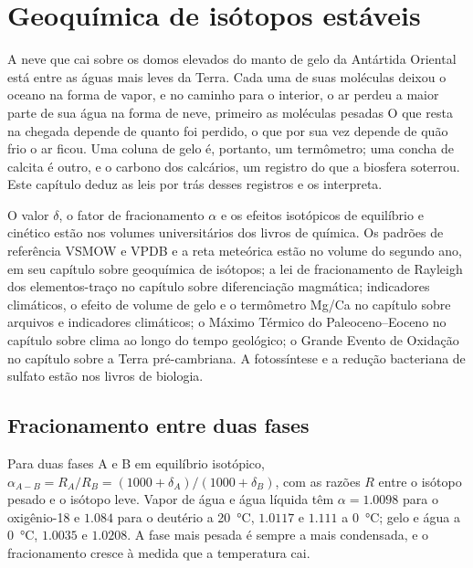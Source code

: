 \chapter{Geoquímica de isótopos estáveis}\label{ch:b3:stable-isotopes}

A neve que cai sobre os domos elevados do manto de gelo da Antártida Oriental está entre
as águas mais leves da Terra. Cada uma de suas moléculas deixou o oceano na forma de vapor, e
no caminho para o interior, o ar perdeu a maior parte de sua água na forma de neve, primeiro as moléculas pesadas
O que resta na chegada depende de quanto foi perdido, o que por sua vez depende de
quão frio o ar ficou. Uma coluna de gelo é, portanto, um termômetro; uma concha
de calcita é outro, e o carbono dos calcários, um registro do que a
biosfera soterrou. Este capítulo deduz as leis por trás desses registros e
os interpreta.

\begin{recall}
O valor $\delta$, o fator de fracionamento $\alpha$ e os efeitos isotópicos de equilíbrio e
cinético estão nos volumes universitários dos livros de química. Os
padrões de referência VSMOW e VPDB e a reta meteórica estão no
volume do segundo ano, em seu capítulo sobre geoquímica de isótopos; a lei de
fracionamento de Rayleigh dos elementos-traço no capítulo sobre
diferenciação magmática; indicadores climáticos, o efeito de volume de gelo e o
termômetro Mg/Ca no capítulo sobre arquivos e indicadores climáticos; o
Máximo Térmico do Paleoceno--Eoceno no capítulo sobre clima ao longo do
tempo geológico; o Grande Evento de Oxidação no capítulo sobre a Terra pré-cambriana.
A fotossíntese e a redução bacteriana de sulfato estão nos livros de biologia.
\end{recall}

\section{Fracionamento entre duas fases}\label{sec:b3:stable-isotopes:fractionation}

Para duas fases A e B em equilíbrio isotópico, $\alpha_{A-B} = R_A/R_B =
(1000 + \delta_A)/(1000 + \delta_B)$, com as razões $R$ entre o isótopo pesado e o
isótopo leve. Vapor de água e água líquida têm $\alpha = 1.0098$ para o oxigênio-18
e $1.084$ para o deutério a \qty{20}{\celsius}, $1.0117$ e $1.111$ a
\qty{0}{\celsius}; gelo e água a \qty{0}{\celsius}, $1.0035$ e $1.0208$.
A fase mais pesada é sempre a mais condensada, e o fracionamento
cresce à medida que a temperatura cai.

